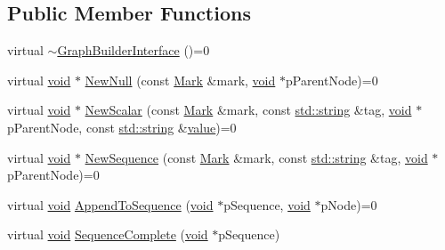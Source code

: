 \subsection*{Public Member Functions}
\begin{DoxyCompactItemize}
\item 
virtual \mbox{\hyperlink{class_y_a_m_l_1_1_graph_builder_interface_a8324da040e5753226f25e7c95e9cd060}{$\sim$\+Graph\+Builder\+Interface}} ()=0
\item 
virtual \mbox{\hyperlink{glad_8h_a950fc91edb4504f62f1c577bf4727c29}{void}} $\ast$ \mbox{\hyperlink{class_y_a_m_l_1_1_graph_builder_interface_a85e609e41a4552f135e34c9544a8e197}{New\+Null}} (const \mbox{\hyperlink{struct_y_a_m_l_1_1_mark}{Mark}} \&mark, \mbox{\hyperlink{glad_8h_a950fc91edb4504f62f1c577bf4727c29}{void}} $\ast$p\+Parent\+Node)=0
\item 
virtual \mbox{\hyperlink{glad_8h_a950fc91edb4504f62f1c577bf4727c29}{void}} $\ast$ \mbox{\hyperlink{class_y_a_m_l_1_1_graph_builder_interface_a1d50e0b6c1a5d89a9ef62a5fefc74640}{New\+Scalar}} (const \mbox{\hyperlink{struct_y_a_m_l_1_1_mark}{Mark}} \&mark, const \mbox{\hyperlink{glad_8h_ac83513893df92266f79a515488701770}{std\+::string}} \&tag, \mbox{\hyperlink{glad_8h_a950fc91edb4504f62f1c577bf4727c29}{void}} $\ast$p\+Parent\+Node, const \mbox{\hyperlink{glad_8h_ac83513893df92266f79a515488701770}{std\+::string}} \&\mbox{\hyperlink{glad_8h_a03aff08f73d7fde3d1a08e0abd8e84fa}{value}})=0
\item 
virtual \mbox{\hyperlink{glad_8h_a950fc91edb4504f62f1c577bf4727c29}{void}} $\ast$ \mbox{\hyperlink{class_y_a_m_l_1_1_graph_builder_interface_a050ae61f3dc8e92015061d2a7af205f0}{New\+Sequence}} (const \mbox{\hyperlink{struct_y_a_m_l_1_1_mark}{Mark}} \&mark, const \mbox{\hyperlink{glad_8h_ac83513893df92266f79a515488701770}{std\+::string}} \&tag, \mbox{\hyperlink{glad_8h_a950fc91edb4504f62f1c577bf4727c29}{void}} $\ast$p\+Parent\+Node)=0
\item 
virtual \mbox{\hyperlink{glad_8h_a950fc91edb4504f62f1c577bf4727c29}{void}} \mbox{\hyperlink{class_y_a_m_l_1_1_graph_builder_interface_ad33488cc66061b8dc506377d26912cf7}{Append\+To\+Sequence}} (\mbox{\hyperlink{glad_8h_a950fc91edb4504f62f1c577bf4727c29}{void}} $\ast$p\+Sequence, \mbox{\hyperlink{glad_8h_a950fc91edb4504f62f1c577bf4727c29}{void}} $\ast$p\+Node)=0
\item 
virtual \mbox{\hyperlink{glad_8h_a950fc91edb4504f62f1c577bf4727c29}{void}} \mbox{\hyperlink{class_y_a_m_l_1_1_graph_builder_interface_a4e27895405da48ca9e67a3636f4cbd03}{Sequence\+Complete}} (\mbox{\hyperlink{glad_8h_a950fc91edb4504f62f1c577bf4727c29}{void}} $\ast$p\+Sequence)

\end{DoxyCompactItemize}
